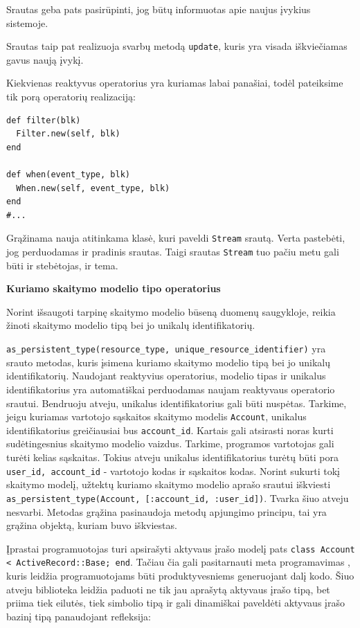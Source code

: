Srautas geba pats pasirūpinti, jog būtų informuotas apie naujus įvykius sistemoje.

Srautas taip pat realizuoja svarbų metodą \lstinline|update|, kuris yra visada iškviečiamas gavus naują įvykį.

Kiekvienas reaktyvus operatorius yra kuriamas labai panašiai, todėl pateiksime tik porą operatorių realizaciją:

\begin{lstlisting}
def filter(blk)
  Filter.new(self, blk)
end

def when(event_type, blk)
  When.new(self, event_type, blk)
end
#...
\end{lstlisting}

Grąžinama nauja atitinkama klasė, kuri paveldi \lstinline|Stream| srautą. Verta pastebėti, jog perduodamas ir pradinis srautas. Taigi srautas \lstinline|Stream| tuo pačiu metu gali būti ir stebėtojas, ir tema.

\textbf{Kuriamo skaitymo modelio tipo operatorius}

Norint išsaugoti tarpinę skaitymo modelio būseną duomenų saugykloje, reikia žinoti skaitymo modelio tipą bei jo unikalų identifikatorių.

\lstinline|as_persistent_type(resource_type, unique_resource_identifier)| yra srauto metodas, kuris įsimena kuriamo skaitymo modelio tipą bei jo unikalų identifikatorių. Naudojant reaktyvius operatorius, modelio tipas ir unikalus identifikatorius yra automatiškai perduodamas naujam reaktyvaus operatorio srautui. Bendruoju atveju, unikalus identifikatorius gali būti nuspėtas. Tarkime, jeigu kuriamas vartotojo sąskaitos skaitymo modelis \lstinline|Account|, unikalus identifikatorius greičiausiai bus \lstinline|account_id|. Kartais gali atsirasti noras kurti sudėtingesnius skaitymo modelio vaizdus. Tarkime, programos vartotojas gali turėti kelias sąskaitas. Tokius atveju unikalus identifikatorius turėtų būti pora \lstinline|user_id, account_id| - vartotojo kodas ir sąskaitos kodas. Norint sukurti tokį skaitymo modelį, užtektų kuriamo skaitymo modelio aprašo srautui iškviesti \lstinline|as_persistent_type(Account, [:account_id, :user_id])|. Tvarka šiuo atveju nesvarbi. Metodas grąžina pasinaudoja metodų apjungimo principu, tai yra grąžina objektą, kuriam buvo iškviestas.

Įprastai programuotojas turi apsirašyti aktyvaus įrašo modelį pats \lstinline|class Account < ActiveRecord::Base; end|. Tačiau čia gali pasitarnauti meta programavimas \cite{Olsen:2007:DPR:1349728}, kuris leidžia programuotojams būti produktyvesniems generuojant dalį kodo. Šiuo atveju biblioteka leidžia paduoti ne tik jau aprašytą aktyvaus įrašo tipą, bet priima tiek eilutės, tiek simbolio tipą ir gali dinamiškai paveldėti aktyvaus įrašo bazinį tipą panaudojant refleksija:

